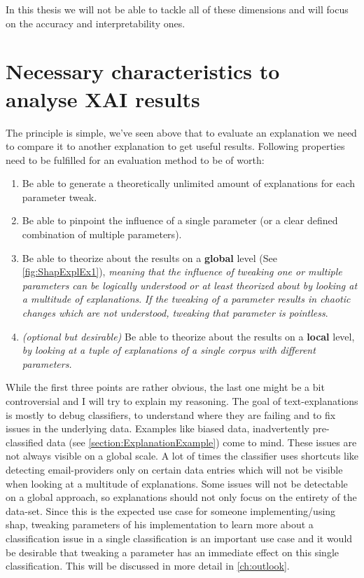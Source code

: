 In this thesis we will not be able to tackle all of these dimensions and will focus on the accuracy and interpretability ones.

\section{Necessary characteristics to analyse XAI results}

The principle is simple, we've seen above that to evaluate an explanation we need to compare it to another explanation to get useful results. Following properties need to be fulfilled for an evaluation method to be of worth:

\begin{enumerate}
    \item Be able to generate a theoretically unlimited amount of explanations for each parameter tweak.
    \item Be able to pinpoint the influence of a single parameter (or a clear defined combination of multiple parameters).
    \item Be able to theorize about the results on a \textbf{global} level (See \autoref{fig:ShapExplEx1}), \textit{meaning that the influence of tweaking one or multiple parameters can be logically understood or at least theorized about by looking at a multitude of explanations}. \textit{If the tweaking of a parameter results in chaotic changes which are not understood, tweaking that parameter is pointless}.
    \item \textit{(optional but desirable)} Be able to theorize about the results on a \textbf{local} level, \textit{by looking at a tuple of explanations of a single corpus with different parameters.}
\end{enumerate}

While the first three points are rather obvious, the last one might be a bit controversial and I will try to explain my reasoning. The goal of text-explanations is mostly to debug classifiers, to understand where they are failing and to fix issues in the underlying data. Examples like biased data, inadvertently pre-classified data (see \autoref{section:ExplanationExample}) come to mind. These issues are not always visible on a global scale. A lot of times the classifier uses shortcuts like detecting email-providers only on certain data entries which will not be visible when looking at a multitude of explanations. Some issues will not be detectable on a global approach, so explanations should not only focus on the entirety of the data-set. Since this is the expected use case for someone implementing/using shap, tweaking parameters of his implementation to learn more about a classification issue in a single classification is an important use case and it would be desirable that tweaking a parameter has an immediate effect on this single classification. This will be discussed in more detail in \autoref{ch:outlook}.


